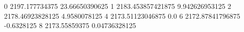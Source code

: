 0 2197.177734375 23.66650390625
1 2183.453857421875 9.942626953125
2 2178.46923828125 4.9580078125
4 2173.51123046875 0.0
6 2172.87841796875 -0.6328125
8 2173.55859375 0.04736328125
